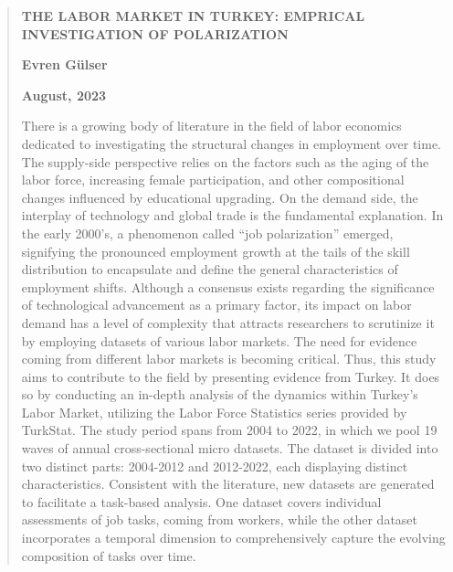 \renewcommand{\abstractname}{ABSTRACT}
\begin{abstract} 
\begin{center}
\textbf{THE LABOR MARKET IN TURKEY: EMPRICAL INVESTIGATION OF POLARIZATION}
\par\end{center}

\begin{center}
\textbf{Evren Gülser}
\par\end{center}

\begin{center}
\textbf{August, 2023}
\par\end{center}

There is a growing body of literature in the field of labor economics
dedicated to investigating the structural changes in employment over
time. The supply-side perspective relies on the factors such as the
aging of the labor force, increasing female participation, and other
compositional changes influenced by educational upgrading. On the
demand side, the interplay of technology and global trade is the fundamental
explanation. In the early 2000's, a phenomenon called ``job
polarization'' emerged, signifying the pronounced employment
growth at the tails of the skill distribution to encapsulate and define
the general characteristics of employment shifts. Although a consensus
exists regarding the significance of technological advancement as
a primary factor, its impact on labor demand has a level of complexity
that attracts researchers to scrutinize it by employing datasets of
various labor markets. The need for evidence coming from different
labor markets is becoming critical. Thus, this study aims to contribute
to the field by presenting evidence from Turkey. It does so by conducting
an in-depth analysis of the dynamics within Turkey's Labor Market,
utilizing the Labor Force Statistics series provided by TurkStat.
The study period spans from 2004 to 2022, in which we pool 19 waves
of annual cross-sectional micro datasets. The dataset is divided into
two distinct parts: 2004-2012 and 2012-2022, each displaying distinct
characteristics. Consistent with the literature, new datasets are
generated to facilitate a task-based analysis. One dataset covers
individual assessments of job tasks, coming from workers, while the
other dataset incorporates a temporal dimension to comprehensively
capture the evolving composition of tasks over time.


\end{abstract}
